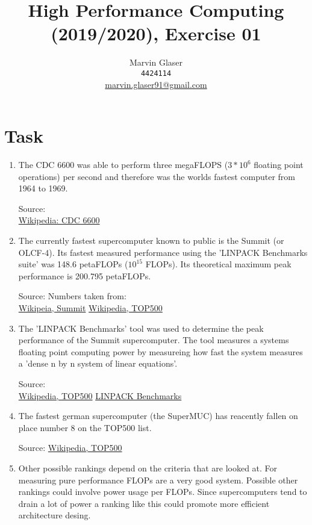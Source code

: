\documentclass{article}
\title{High Performance Computing (2019/2020), Exercise 01}
\author{
Marvin Glaser \\ \texttt{4424114} \\ \href{mailto:marvin.glaser91@gmail.com}{marvin.glaser91@gmail.com}
}
\begin{document}
\maketitle


\section{Task}

\begin{enumerate}[label=(\alph*)]

\item The CDC 6600 was able to perform three megaFLOPS
($3*10^6$ floating point operations) per second and therefore was the worlds fastest computer
from 1964 to 1969.

Source: \\
\href{https://en.wikipedia.org/wiki/CDC_6600}{Wikipedia: CDC 6600}


\item The currently fastest supercomputer known to public is the Summit (or OLCF-4). Its fastest
measured performance using the 'LINPACK Benchmarks suite' was 148.6 petaFLOPs ($10^15$ FLOPs).
Its theoretical maximum peak performance is 200.795 petaFLOPs.

Source:
Numbers taken from:\\ 
\href{https://en.wikipedia.org/wiki/Summit_(supercomputer)}{Wikipeia, Summit}
\href{https://en.wikipedia.org/wiki/TOP500}{Wikipedia, TOP500}



\item The 'LINPACK Benchmarks' tool was used to determine the peak performance of the Summit
supercomputer. The tool measures a systems floating point computing power by measureing how fast
the system measures a 'dense n by n system of linear equations'.

Source: \\
\href{https://en.wikipedia.org/wiki/TOP500}{Wikipedia, TOP500}
\href{https://en.wikipedia.org/wiki/LINPACK_benchmarks}{LINPACK Benchmarks}


\item The fastest german supercomputer (the SuperMUC) has reacently fallen on place number 8 on the
TOP500 list.

Source:
\href{https://en.wikipedia.org/wiki/TOP500}{Wikipedia, TOP500}


\item Other possible rankings depend on the criteria that are looked at. For measuring pure performance
FLOPs are a very good system. Possible other rankings could involve power usage per FLOPs. Since
supercomputers tend to drain a lot of power a ranking like this could promote more efficient
architecture desing.
\end{enumerate}
\end{document}

